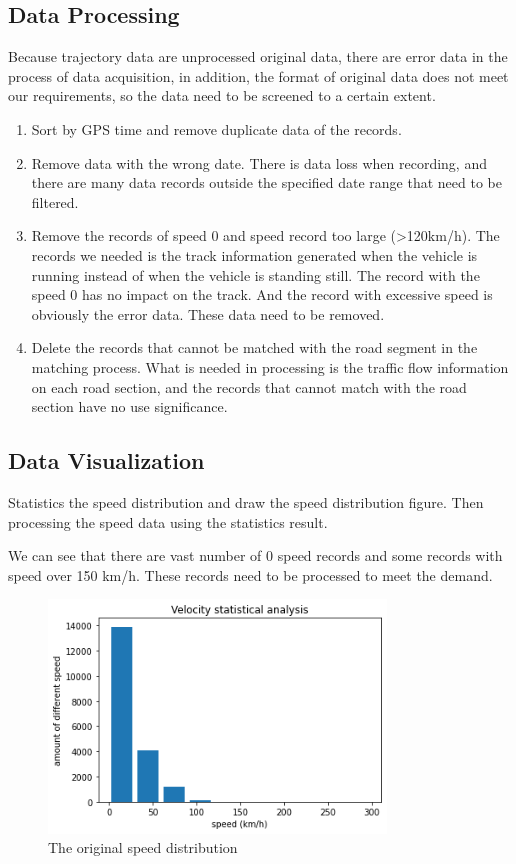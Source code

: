 \documentclass[fontset=none]{ctexart}
\theoremstyle{definition}
\theoremstyle{remark}
\begin{document}
\subsection{Data Processing}
Because trajectory data are unprocessed original data, there are error data in the process of data acquisition, in addition, the format of original data does not meet our requirements, so the data need to be screened to a certain extent.
\begin{enumerate}
  \item Sort by GPS time and remove duplicate data of the records.
  \item Remove data with the wrong date. There is data loss when recording, and there are many data records outside the specified date range that need to be filtered.
  \item Remove the records of speed 0 and speed record too large (>120km/h). The records we needed is the track information generated when the vehicle is running instead of when the vehicle is standing still. The record with the speed 0 has no impact on the track. And the record with excessive speed is obviously the error data. These data need to be removed.
  \item Delete the records that cannot be matched with the road segment in the matching process. What is needed in processing is the traffic flow information on each road section, and the records that cannot match with the road section have no use significance.
\end{enumerate}

\subsection{Data Visualization}
Statistics the speed distribution and draw the speed distribution figure. Then processing the speed data using the statistics result.

We can see that there are vast number of 0 speed records and some records with speed over 150 km/h. These records need to be processed to meet the demand.

\begin{figure}[htb]
  \centering
  \includegraphics[width=0.8\textwidth]{images/7-2-2.png}
  \caption{The original speed distribution}
  \label{fig: 722}
\end{figure}
\end{document}

